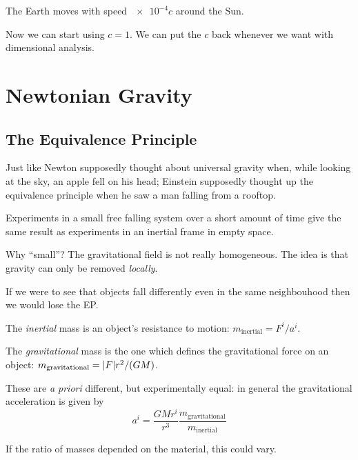 \documentclass[main.tex]{subfiles}
\begin{document}
The Earth moves with speed \(\num{e-4}  c\) around the Sun.


Now we can start using \(c=1\). We can put the \(c\) back whenever we want with dimensional analysis.

\section{Newtonian Gravity}

\subsection{The Equivalence Principle}

Just like Newton supposedly thought about universal gravity when, while looking at the sky, an apple fell on his head; Einstein supposedly thought up the equivalence principle when he saw a man falling from a rooftop.

\begin{proposition}
Experiments in a small free falling system over a short amount of time give the same result as experiments in an inertial frame in empty space.
\end{proposition}

Why ``small''? The gravitational field is not really homogeneous.
The idea is that gravity can only be removed \emph{locally}.

If we were to see that objects fall differently even in the same neighbouhood then we would lose the EP.

\begin{definition}
The \emph{inertial} mass is an object's resistance to motion: \(m _{\text{inertial}} = F^{i}/ a^{i}\).
\end{definition}

\begin{definition}
The \emph{gravitational} mass is the one which defines the gravitational force on an object: \(m _{\text{gravitational}} = \abs{F} r^2 / (G M)\).
\end{definition}

These are \emph{a priori} different, but experimentally equal: in general the gravitational acceleration is given by
\begin{equation}
a^{i} = \frac{GM r^{i} }{r^3} \frac{m _{\text{gravitational}}}{m _{\text{inertial}}}  
\end{equation}

If the ratio of masses depended on the material, this could vary.
\end{document}
